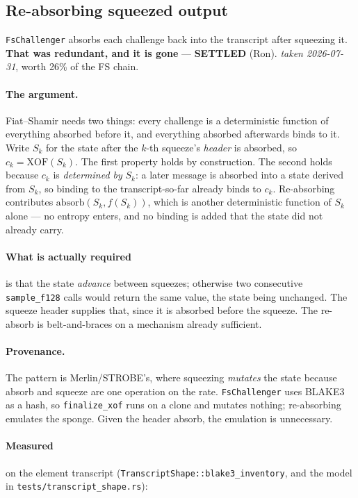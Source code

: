 \documentclass[11pt]{article}
\newcommand{\code}[1]{\texttt{#1}}
\newcommand{\settled}[1]{\medskip\noindent\textbf{SETTLED} (#1).\xspace}
\theoremstyle{definition}
\begin{document}
\subsection{Re-absorbing squeezed output}\label{sec:reabsorb}

\code{FsChallenger} absorbs each challenge back into the transcript after
squeezing it. \textbf{That was redundant, and it is gone} --- \settled{Ron} \emph{taken
2026-07-31}, worth 26\% of the FS chain.

\paragraph{The argument.} Fiat--Shamir needs two things: every challenge is a
deterministic function of everything absorbed before it, and everything
absorbed afterwards binds to it. Write $S_k$ for the state after the $k$-th
squeeze's \emph{header} is absorbed, so $c_k = \mathrm{XOF}(S_k)$. The first
property holds by construction. The second holds because $c_k$ is
\emph{determined by} $S_k$: a later message is absorbed into a state derived
from $S_k$, so binding to the transcript-so-far already binds to $c_k$.
Re-absorbing contributes $\mathrm{absorb}(S_k, f(S_k))$, which is another
deterministic function of $S_k$ alone --- no entropy enters, and no binding is
added that the state did not already carry.

\paragraph{What is actually required} is that the state \emph{advance} between
squeezes; otherwise two consecutive \code{sample\_f128} calls would return the
same value, the state being unchanged. The squeeze header supplies that, since
it is absorbed before the squeeze. The re-absorb is belt-and-braces on a
mechanism already sufficient.

\paragraph{Provenance.} The pattern is Merlin/STROBE's, where squeezing
\emph{mutates} the state because absorb and squeeze are one operation on the
rate. \code{FsChallenger} uses BLAKE3 as a hash, so \code{finalize\_xof} runs
on a clone and mutates nothing; re-absorbing emulates the sponge. Given the
header absorb, the emulation is unnecessary.

\paragraph{Measured} on the element transcript
(\code{TranscriptShape::blake3\_inventory}, and the model in
\code{tests/transcript\_shape.rs}):
\end{document}
